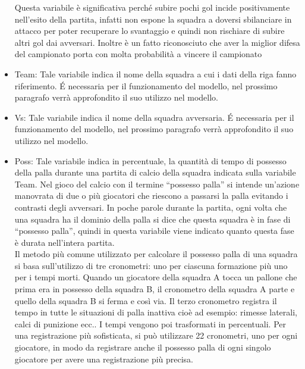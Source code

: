 \begin{itemize}
	Questa variabile è significativa perché subire pochi gol incide positivamente nell'esito della partita, infatti non espone la squadra a doversi sbilanciare in attacco per poter recuperare lo svantaggio e quindi non rischiare di subire altri gol dai avversari. Inoltre è un fatto riconosciuto che aver la miglior difesa del campionato porta con molta probabilità a vincere il campionato
	\item \textsf{Team}: Tale variabile indica il nome della squadra a cui i dati della riga fanno riferimento. É necessaria per il funzionamento del modello, nel prossimo paragrafo verrà approfondito il suo utilizzo nel modello.
	\item \textsf{Vs}: Tale variabile indica il nome della squadra avversaria. É necessaria per il funzionamento del modello, nel prossimo paragrafo verrà approfondito il suo utilizzo nel modello.
	\item \textsf{Poss}: Tale variabile indica in percentuale, la quantità di tempo di possesso della palla durante una partita di calcio della squadra indicata sulla variabile \textsf{Team}. Nel gioco del calcio con il termine “possesso palla” si intende un’azione manovrata di due o più giocatori che riescono a passarsi la palla evitando i contrasti degli avversari. In poche parole durante la partita, ogni volta che una squadra ha il dominio della palla si dice che questa squadra è in fase di “possesso palla”, quindi in questa variabile viene indicato quanto questa fase è durata nell'intera partita.\\
	Il metodo più comune utilizzato per calcolare il possesso palla di una squadra si basa sull'utilizzo di tre cronometri: uno per ciascuna formazione più uno per i tempi morti. Quando un giocatore della squadra A tocca un pallone che prima era in possesso della squadra B, il cronometro della squadra A parte e quello della squadra B si ferma e così via. Il terzo cronometro registra il tempo in tutte le situazioni di palla inattiva cioè ad esempio: rimesse laterali, calci di punizione ecc.. I tempi vengono poi trasformati in percentuali. Per una registrazione più sofisticata, si può utilizzare 22 cronometri, uno per ogni giocatore, in modo da registrare anche il possesso palla di ogni singolo giocatore per avere una registrazione più precisa.
	

\end{itemize}
